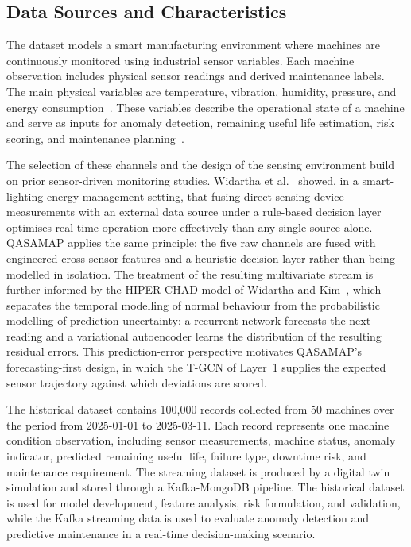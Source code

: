 \subsection{Data Sources and Characteristics}

The dataset models a smart manufacturing environment where machines are continuously monitored using industrial sensor variables. Each machine observation includes physical sensor readings and derived maintenance labels. The main physical variables are temperature, vibration, humidity, pressure, and energy consumption~\cite{widartha_smart_lighting_2024}. These variables describe the operational state of a machine and serve as inputs for anomaly detection, remaining useful life estimation, risk scoring, and maintenance planning~\cite{widartha_hiper_chad_2025}.

The selection of these channels and the design of the sensing environment build on prior sensor-driven monitoring studies. Widartha et al.~\cite{widartha_smart_lighting_2024} showed, in a smart-lighting energy-management setting, that fusing direct sensing-device measurements with an external data source under a rule-based decision layer optimises real-time operation more effectively than any single source alone. QASAMAP applies the same principle: the five raw channels are fused with engineered cross-sensor features and a heuristic decision layer rather than being modelled in isolation. The treatment of the resulting multivariate stream is further informed by the HIPER-CHAD model of Widartha and Kim~\cite{widartha_hiper_chad_2025}, which separates the temporal modelling of normal behaviour from the probabilistic modelling of prediction uncertainty: a recurrent network forecasts the next reading and a variational autoencoder learns the distribution of the resulting residual errors. This prediction-error perspective motivates QASAMAP's forecasting-first design, in which the T-GCN of Layer~1 supplies the expected sensor trajectory against which deviations are scored.



The historical dataset contains 100,000 records collected from 50 machines over the period from 2025-01-01 to 2025-03-11. Each record represents one machine condition observation, including sensor measurements, machine status, anomaly indicator, predicted remaining useful life, failure type, downtime risk, and maintenance requirement. The streaming dataset is produced by a digital twin simulation and stored through a Kafka-MongoDB pipeline. The historical dataset is used for model development, feature analysis, risk formulation, and validation, while the Kafka streaming data is used to evaluate anomaly detection and predictive maintenance in a real-time decision-making scenario.

